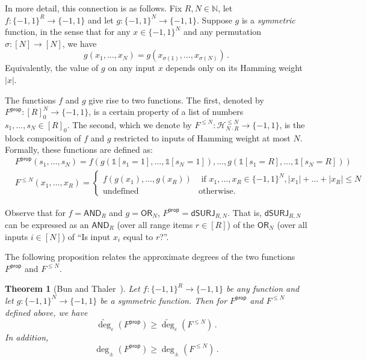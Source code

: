 \documentclass[11pt]{article}
\numberwithin{equation}{section}
\newtheorem{theorem}{Theorem}[section]
\theoremstyle{definition}
\theoremstyle{plain}
\newcommand{\N}{\mathbb N}
\newcommand{\dumSURJ}{\mathsf{dSURJ}}
\newcommand{\OR}{\mathsf{ OR}}
\newcommand{\bits}{\{-1,1\}}
\newcommand{\eps}{\varepsilon}
\newcommand{\adeg}{\widetilde{\operatorname{deg}}}
\newcommand{\AND}{\mathsf{AND}}
\begin{document}
In more detail, this connection is as follows. 
Fix $R, N \in \N$, let $f : \bits^R \to \bits$ and let $g : \bits^N \to \bits$. Suppose $g$ is a \emph{symmetric} function, in the sense that for any $x \in \bits^N$ and any permutation $\sigma : [N] \to [N]$, we have
\[g(x_1, \dots, x_N) = g(x_{\sigma(1)}, \dots, x_{\sigma(N)})\,.\]
Equivalently, the value of $g$ on any input $x$ depends only on its Hamming weight $|x|$.

The functions $f$ and $g$ give rise to two functions. The first, denoted by $F^{\mathsf{prop}} : [R]^N_0 \to \bits$, is a certain property of a list of numbers $s_1, \dots, s_N \in [R]_0$. The second, which we denote by $F^{\le N} : \mathcal{H}_{N \cdot R}^{\le N} \to \bits$, is the block composition of $f$ and $g$ restricted to inputs of Hamming weight at most $N$. Formally, these functions are defined as:
\begin{align*}
&F^{\mathsf{prop}}(s_1, \dots, s_N) = f(g(\mathds{1}[s_1 = 1], \dots, \mathds{1}[s_N = 1]), \dots, g(\mathds{1}[s_1=R], \dots,\mathds{1}[s_N=R])) \\
&F^{\le N}(x_1, \dots, x_R) = \begin{cases} f(g(x_1), \dots, g(x_R)) & \text{ if } x_1, \dots, x_R \in \bits^N,  |x_1| + \dots + |x_R| \le N\\
\text{undefined} & \text{otherwise}.
\end{cases}
\end{align*}

Observe that for $f=\AND_R$ and $g = \OR_N$, $F^{\mathsf{prop}}=\dumSURJ_{R, N}$. 
That is, $\dumSURJ_{R, N}$ can be expressed as an $\AND_R$ (over all range items $r \in [R]$) of the $\OR_N$ (over all inputs $i \in [N]$) of ``Is input $x_i$ equal to $r$?''.

The following proposition relates the approximate degrees of the two functions $F^{\mathsf{prop}}$ and $F^{\le N}$.

\begin{theorem}[Bun and Thaler~\cite{adegsurj}] \label{thm:main-reduction}
	Let $f : \bits^R \to \bits$ be any function and let $g : \bits^N \to \bits$ be a symmetric function. Then for $F^{\mathsf{prop}}$ and $F^{\le N}$ defined above, we have
	\[\adeg_{\eps}(F^{\mathsf{prop}}) \ge \adeg_{\eps}(F^{\le N})\,.\]
	In addition, \[\deg_{\pm}(F^{\mathsf{prop}}) \ge \deg_{\pm}(F^{\le N})\,.\]
\end{theorem}
\end{document}

